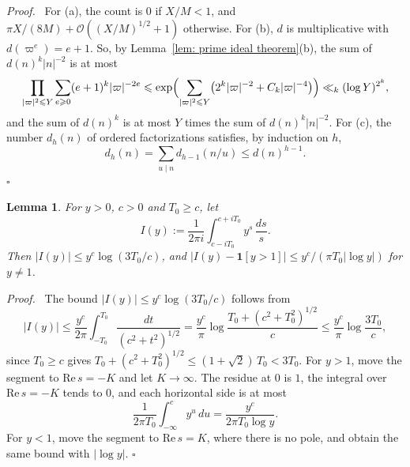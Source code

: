 \documentclass{article}
\numberwithin{equation}{section}
\newtheorem{lemma}{Lemma}
\newenvironment{proof}[1][Proof]{\par\medskip\noindent\textit{#1.}\ }{\hfill$\square$\par\medskip}
\newcommand{\Le}{\leqslant}
\newcommand{\Ge}{\geqslant}
\begin{document}
\begin{proof}
For (a), the count is $0$ if $X/M < 1$, and $\pi X/(8M) + \mathcal{O}((X/M)^{1/2} + 1)$ otherwise. For (b), $d$ is multiplicative with $d(\varpi^e) = e + 1$. So, by Lemma~\ref{lem: prime ideal theorem}(b), the sum of $d(n)^k |n|^{-2}$ is at most
\begin{equation*}
\prod_{|\varpi|^2 \Le Y} \sum_{e \Ge 0} (e + 1)^k |\varpi|^{-2e} \Le \exp\Bigl( \sum_{|\varpi|^2 \Le Y} \bigl( 2^k |\varpi|^{-2} + C_k |\varpi|^{-4} \bigr) \Bigr) \ll_k (\log Y)^{2^k},
\end{equation*}
and the sum of $d(n)^k$ is at most $Y$ times the sum of $d(n)^k |n|^{-2}$. For (c), the number $d_h(n)$ of ordered factorizations satisfies, by induction on $h$,
\begin{equation*}
d_h(n) = \sum_{u \mid n} d_{h-1}(n/u) \Le d(n)^{h-1}.
\end{equation*}
\end{proof}

\begin{lemma}
\label{lem: perron}
For $y > 0$, $c > 0$ and $T_0 \Ge c$, let
\begin{equation*}
I(y) := \frac{1}{2\pi i} \int_{c - iT_0}^{c + iT_0} y^s\, \frac{ds}{s}.
\end{equation*}
Then $|I(y)| \Le y^c \log(3T_0/c)$, and $|I(y) - \mathbf{1}[y > 1]| \Le y^c/(\pi T_0 |\log y|)$ for $y \neq 1$.
\end{lemma}

\begin{proof}
The bound $|I(y)| \Le y^c \log(3T_0/c)$ follows from
\begin{equation*}
|I(y)| \Le \frac{y^c}{2\pi} \int_{-T_0}^{T_0} \frac{dt}{(c^2 + t^2)^{1/2}} = \frac{y^c}{\pi} \log\frac{T_0 + (c^2 + T_0^2)^{1/2}}{c} \Le \frac{y^c}{\pi} \log\frac{3T_0}{c},
\end{equation*}
since $T_0 \Ge c$ gives $T_0 + (c^2 + T_0^2)^{1/2} \Le (1 + \sqrt{2})\, T_0 < 3T_0$. For $y > 1$, move the segment to $\mathrm{Re}\, s = -K$ and let $K \to \infty$. The residue at $0$ is $1$, the integral over $\mathrm{Re}\, s = -K$ tends to $0$, and each horizontal side is at most
\begin{equation*}
\frac{1}{2\pi T_0} \int_{-\infty}^{c} y^u\, du = \frac{y^c}{2\pi T_0 \log y}.
\end{equation*}
For $y < 1$, move the segment to $\mathrm{Re}\, s = K$, where there is no pole, and obtain the same bound with $|\log y|$.
\end{proof}
\end{document}
